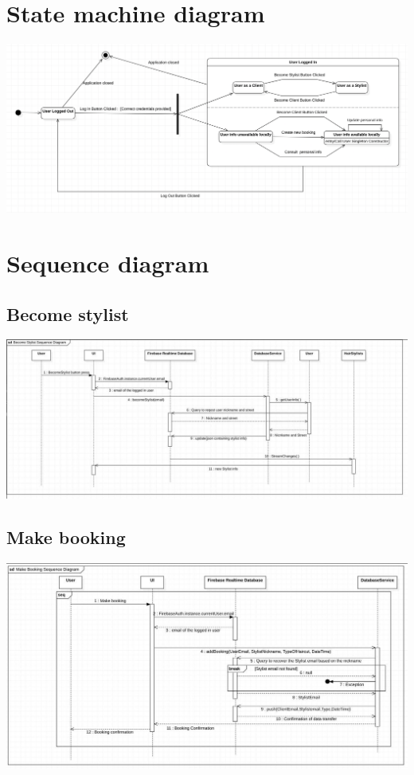 \documentclass{article}
\begin{document}
\section{State machine diagram}
\includegraphics[scale = 0.5]{ImmaginiUML/StateMachineDiagram.png}
\newpage
\section{Sequence diagram}
\subsection{Become stylist}
\includegraphics[scale=0.45]{ImmaginiUML/Sequence1.jpg}
\subsection{Make booking}
\includegraphics[scale=0.45]{ImmaginiUML/Sequence2.jpg}
\end{document}
